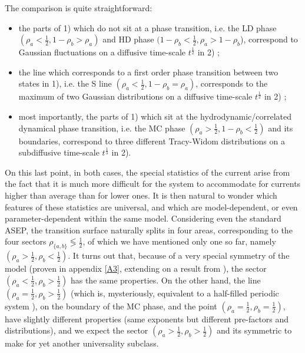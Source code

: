 \documentclass[aps,pre,onecolumn,showpacs,showkeys,a4paper]{revtex4-1}
\begin{document}
The comparison is quite straightforward:
\begin{itemize}
\item the parts of 1) which do not sit at a phase transition, i.e. the LD  phase $(\rho_a<\frac{1}{2},1-\rho_b>\rho_a)$ and HD phase $(1-\rho_b<\frac{1}{2},\rho_a>1-\rho_b$), correspond to Gaussian fluctuations on a diffusive time-scale $t^{\frac{1}{2}}$ in 2) ;
\item the line which corresponds to a first order phase transition between two states in 1), i.e. the S line $(\rho_a<\frac{1}{2},1-\rho_b=\rho_a)$, corresponds to the maximum of two Gaussian distributions on a diffusive time-scale $t^{\frac{1}{2}}$ in 2) ;
\item most importantly, the parts of 1) which sit at the hydrodynamic/correlated dynamical phase transition, i.e. the MC phase $(\rho_a>\frac{1}{2},1-\rho_b<\frac{1}{2})$ and its boundaries, correspond to three different Tracy-Widom distributions on a subdiffusive time-scale $t^{\frac{1}{3}}$ in 2).
\end{itemize}

On this last point, in both cases, the special statistics of the current arise from the fact that it is much more difficult for the system to accommodate for currents higher than average than for lower ones. It is then natural to wonder which features of these statistics are universal, and which are model-dependent, or even parameter-dependent within the same model. Considering even the standard ASEP, the transition surface naturally splits in four areas, corresponding to the four sectors $\rho_{\{a,b\}}\lessgtr\frac{1}{2}$, of which we have mentioned only one so far, namely $(\rho_a>\frac{1}{2},\rho_b<\frac{1}{2})$. It turns out that, because of a very special symmetry of the model (proven in appendix \ref{A3}, extending on a result from \cite{Torkaman2015}), the sector $(\rho_a<\frac{1}{2},\rho_b>\frac{1}{2})$ has the same properties. On the other hand, the line $(\rho_a=\frac{1}{2},\rho_b>\frac{1}{2})$ (which is, mysteriously, equivalent to a half-filled periodic system \cite{derrida1999universal}), on the boundary of the MC phase, and the point $(\rho_a=\frac{1}{2},\rho_b=\frac{1}{2})$, have slightly different properties (same exponents but different pre-factors and distributions), and we expect the sector $(\rho_a>\frac{1}{2},\rho_b>\frac{1}{2})$ and its symmetric to make for yet another universality subclass. 
\end{document}
